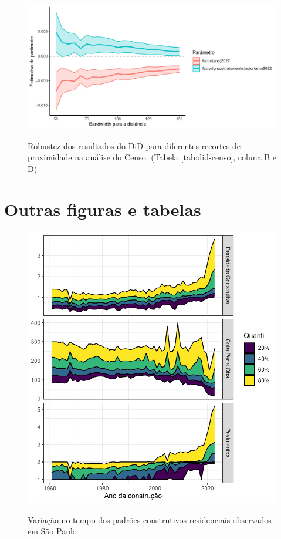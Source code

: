 \begin{apendicesenv}
\begin{figure}[!h]
    \centering
    \caption{Robustez dos resultados do DiD para diferentes recortes de proximidade na análise do Censo. (Tabela \ref{tab:did-censo}, coluna B e D)}
    \includegraphics[width = \linewidth]{figuras/did-censo-bandas.pdf}
    \label{fig:robustez-did-censo}
\end{figure}















\chapter{Outras figuras e tabelas}
\label{appendix:figuras}

\clearpage

\begin{figure}[h]
    \centering
    \caption{Variação no tempo dos padrões construtivos residenciais observados em São Paulo}
    \includegraphics[width = .75\linewidth]{figuras/indicadores_tempo.pdf}
    \label{fig:indicadores-tempo}
\end{figure}


\end{apendicesenv}
